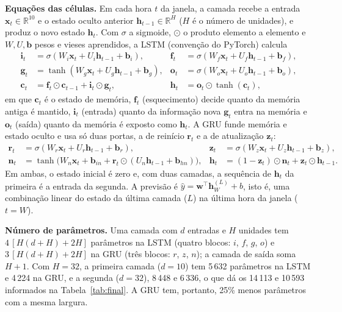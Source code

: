 \documentclass[11pt,a4paper]{article}
\begin{document}
\textbf{Equações das células.} Em cada hora $t$ da janela, a camada recebe a entrada $\mathbf{x}_t\in\mathbb{R}^{10}$ e o estado oculto anterior $\mathbf{h}_{t-1}\in\mathbb{R}^{H}$ ($H$ é o número de unidades), e produz o novo estado $\mathbf{h}_t$. Com $\sigma$ a sigmoide, $\odot$ o produto elemento a elemento e $W,U,\mathbf{b}$ pesos e vieses aprendidos, a LSTM (convenção do PyTorch) calcula
\begin{align}
\mathbf{i}_t &= \sigma(W_i\mathbf{x}_t + U_i\mathbf{h}_{t-1} + \mathbf{b}_i), &
\mathbf{f}_t &= \sigma(W_f\mathbf{x}_t + U_f\mathbf{h}_{t-1} + \mathbf{b}_f), \\
\mathbf{g}_t &= \tanh(W_g\mathbf{x}_t + U_g\mathbf{h}_{t-1} + \mathbf{b}_g), &
\mathbf{o}_t &= \sigma(W_o\mathbf{x}_t + U_o\mathbf{h}_{t-1} + \mathbf{b}_o), \\
\mathbf{c}_t &= \mathbf{f}_t\odot\mathbf{c}_{t-1} + \mathbf{i}_t\odot\mathbf{g}_t, &
\mathbf{h}_t &= \mathbf{o}_t\odot\tanh(\mathbf{c}_t),
\end{align}
em que $\mathbf{c}_t$ é o estado de memória, $\mathbf{f}_t$ (esquecimento) decide quanto da memória antiga é mantido, $\mathbf{i}_t$ (entrada) quanto da informação nova $\mathbf{g}_t$ entra na memória e $\mathbf{o}_t$ (saída) quanto da memória é exposto como $\mathbf{h}_t$. A GRU funde memória e estado oculto e usa só duas portas, a de reinício $\mathbf{r}_t$ e a de atualização $\mathbf{z}_t$:
\begin{align}
\mathbf{r}_t &= \sigma(W_r\mathbf{x}_t + U_r\mathbf{h}_{t-1} + \mathbf{b}_r), &
\mathbf{z}_t &= \sigma(W_z\mathbf{x}_t + U_z\mathbf{h}_{t-1} + \mathbf{b}_z), \\
\mathbf{n}_t &= \tanh\big(W_n\mathbf{x}_t + \mathbf{b}_{in} + \mathbf{r}_t\odot(U_n\mathbf{h}_{t-1} + \mathbf{b}_{hn})\big), &
\mathbf{h}_t &= (1-\mathbf{z}_t)\odot\mathbf{n}_t + \mathbf{z}_t\odot\mathbf{h}_{t-1}.
\end{align}
Em ambas, o estado inicial é zero e, com duas camadas, a sequência de $\mathbf{h}_t$ da primeira é a entrada da segunda. A previsão é $\hat y = \mathbf{w}^\top\mathbf{h}_W^{(L)} + b$, isto é, uma combinação linear do estado da última camada ($L$) na última hora da janela ($t=W$).

\textbf{Número de parâmetros.} Uma camada com $d$ entradas e $H$ unidades tem $4\,[H(d+H)+2H]$ parâmetros na LSTM (quatro blocos: $i$, $f$, $g$, $o$) e $3\,[H(d+H)+2H]$ na GRU (três blocos: $r$, $z$, $n$); a camada de saída soma $H+1$. Com $H=32$, a primeira camada ($d=10$) tem 5\,632 parâmetros na LSTM e 4\,224 na GRU, e a segunda ($d=32$), 8\,448 e 6\,336, o que dá os 14\,113 e 10\,593 informados na Tabela~\ref{tab:final}. A GRU tem, portanto, 25\% menos parâmetros com a mesma largura.
\end{document}
